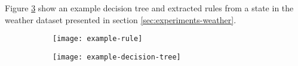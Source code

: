 Figure \ref{fig:example-decision-tree-and-rule} show an example decision tree and extracted rules
from a state in the weather dataset presented in section \ref{sec:experiments-weather}.

\begin{figure}[h!]
	\centering
	\begin{subfigure}{.3\columnwidth}
	  	\centering
	  	\texttt{[image: example-rule]}
  		\caption{}
  		\label{fig:example-rule}
	\end{subfigure}
	\begin{subfigure}{.68\columnwidth}
	  	\centering
	  	\texttt{[image: example-decision-tree]}
	  	\caption{}
	  	\label{fig:example-decision-tree}
	\end{subfigure}
	\label{fig:example-decision-tree-and-rule}
\end{figure}

\iffalse
\subsection{Visual Assistance}

When a state becomes selected, the user interface presents the user with several visual aids which
assist them in identifying the states' meaning. The first of these aids is the timeline histogram
which shows the distribution of the states occurrence over time. An example is shown in Figure 
\ref{fig:time-hist}.

\begin{figure}[h!]
	\centering
	\texttt{[image: timeline]}
	\caption{[TODO example decision tree].}
	\label{fig:time-hist}
\end{figure}

[TODO histograms]
\fi
